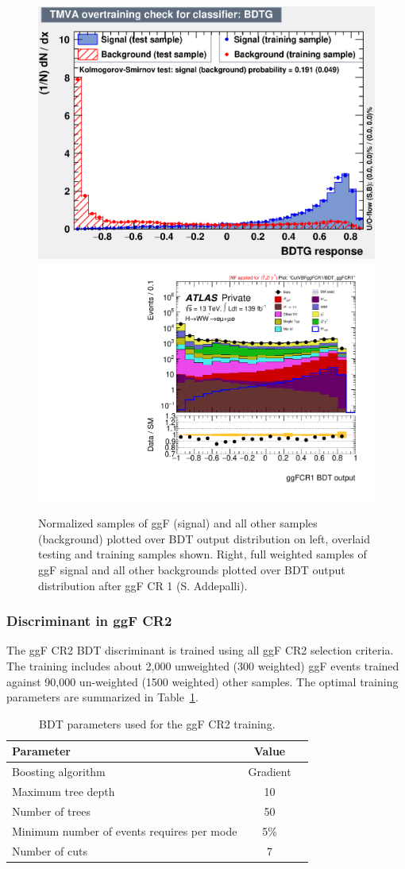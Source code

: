 \begin{figure}[!htbp]
\centering
  \includegraphics[width=.4\linewidth]{Pictures/ggFCR1/overtrain_BDTG.eps}
  \includegraphics[width=.45\linewidth]{Pictures/run2-emme-CutVBFggFCR1-BDT_ggFCR1-log.pdf}
\caption{Normalized samples of ggF (signal) and all other samples (background) plotted over BDT output distribution on left, overlaid testing and training samples shown. Right, full weighted samples of ggF signal and all other backgrounds plotted over BDT output distribution after ggF CR 1 (S. Addepalli).}
\label{fig:ggFCR1BDTresult}
\end{figure}

\subsubsection{Discriminant in ggF CR2}

The ggF CR2 BDT discriminant is trained using all ggF CR2 selection criteria. The training includes about 2,000 unweighted (300 weighted) ggF events trained against 90,000 un-weighted (1500 weighted) other samples. The optimal training parameters are summarized in Table~\ref{tab:ggFCR2BDTparameters}.
\begin{table}[h!]
\centering
\begin{tabular}{|l|c|c|}
\hline
Parameter                                    & Value     \\
\hline
Boosting algorithm                           & Gradient \\
Maximum tree depth                           &  10      \\
Number of trees                              &  50    \\
Minimum number of events requires per mode   &  5\%     \\ 
Number of cuts                               &  7       \\
\hline
\end{tabular}
\caption{BDT parameters used for the ggF CR2 training.}
\label{tab:ggFCR2BDTparameters}
\end{table}

